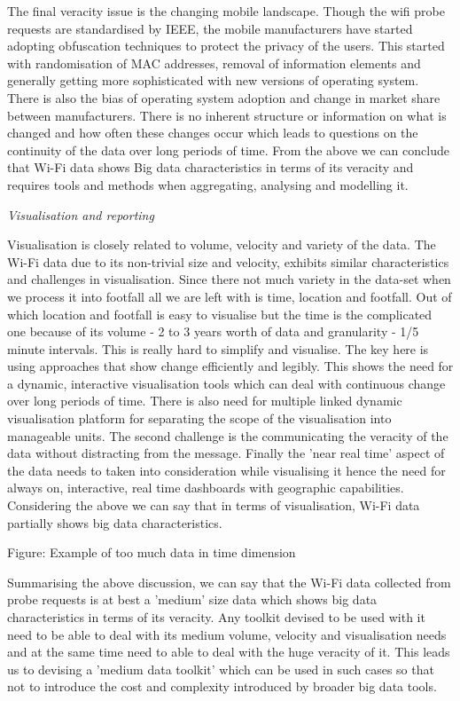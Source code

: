 The final veracity issue is the changing mobile landscape.
Though the wifi probe requests are standardised by IEEE, the mobile manufacturers have started adopting obfuscation techniques to protect the privacy of the users.
This started with randomisation of MAC addresses, removal of information elements and generally getting more sophisticated with new versions of operating system.
There is also the bias of operating system adoption and change in market share between manufacturers.
There is no inherent structure or information on what is changed and how often these changes occur which leads to questions on the continuity of the data over long periods of time.
From the above we can conclude that Wi-Fi data shows Big data characteristics in terms of its veracity and requires tools and methods when aggregating, analysing and modelling it.


\textit{Visualisation and reporting}

Visualisation is closely related to volume, velocity and variety of the data.
The Wi-Fi data due to its non-trivial size and velocity, exhibits similar characteristics and challenges in visualisation.
Since there not much variety in the data-set when we process it into footfall all we are left with is time, location and footfall.
Out of which location and footfall is easy to visualise but the time is the complicated one because of its volume - 2 to 3 years worth of data and granularity - 1/5 minute intervals.
This is really hard to simplify and visualise.
The key here is using approaches that show change efficiently and legibly.
This shows the need for a dynamic, interactive visualisation tools which can deal with continuous change over long periods of time.
There is also need for multiple linked dynamic visualisation platform for separating the scope of the visualisation into manageable units.
The second challenge is the communicating the veracity of the data without distracting from the message.
Finally the 'near real time' aspect of the data needs to taken into consideration while visualising it hence the need for always on, interactive, real time dashboards with geographic capabilities.
Considering the above we can say that in terms of visualisation, Wi-Fi data partially shows big data characteristics.

Figure: Example of too much data in time dimension

Summarising the above discussion, we can say that the Wi-Fi data collected from probe requests is at best a 'medium' size data which shows big data characteristics in terms of its veracity.
Any toolkit devised to be used with it need to be able to deal with its medium volume, velocity and visualisation needs and at the same time need to able to deal with the huge veracity of it.
This leads us to devising a 'medium data toolkit' which can be used in such cases so that not to introduce the cost and complexity introduced by broader big data tools.

